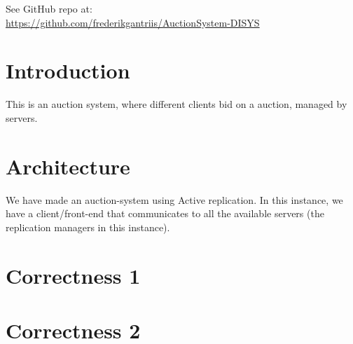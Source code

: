 \documentclass[a4paper, 11pt]{article}
\begin{document}
\maketitle
\begin{center}See GitHub repo at:\\
{\Large \url{https://github.com/frederikgantriis/AuctionSystem-DISYS}}
\end{center}

\section{Introduction}
This is an auction system, where different clients bid on a auction, managed by servers.

\section{Architecture}
We have made an auction-system using Active replication. In this instance, we have a client/front-end that communicates to all the available servers (the replication managers in this instance).

\section{Correctness 1}

\section{Correctness 2}
\end{document}
